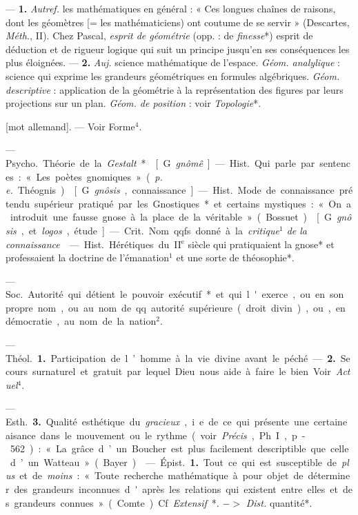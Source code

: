 \begin{itemize}[leftmargin=1cm, label=, itemsep=1pt]
 — {\bf 1.} {\it Autref.} les mathématiques en général : « Ces
longues chaînes de raisons, dont les géomètres [= les mathématiciens) ont
coutume de se servir » (Descartes, {\it Méth.}, II). Chez Pascal,
{\it esprit de géométrie} (opp. : de {\it finesse}*) esprit de déduction et
de rigueur logique qui suit un principe jusqu'en ses conséquences les plus
éloignées. — {\bf 2.} {\it Auj.} science mathématique de l’espace.
{\it Géom. analylique} : science qui exprime les grandeurs géométriques en
formules algébriques. {\it Géom. descriptive} : application de la géométrie à
la représentation des figures par leurs projections sur un plan.
{\it Géom. de position} : voir {\it Topologie}*.

 [mot allemand]. — Voir Forme$^4$.

 — \si{Psycho.} Théorie de la {\it Gestalt}*.

 [G. {\it gnômê}]. — \si{Hist.} Qui parle par sentences : « Les
poètes gnomiques » ({\it p. e.} Théognis).

 [G. {\it gnôsis}, connaissance]. — \si{Hist.} Mode de connaissance
prétendu supérieur pratiqué par les Gnostiques* et certains mystiques : « On
a introduit une fausse gnose à la place de la véritable » (Bossuet).

 [G. {\it gnôsis}, et {\it logos}, étude].
— \si{Crit.} Nom qqfs. donné à la {\it critique$^1$ de la connaissance}.

 — \si{Hist.} Hérétiques du
{\footnotesize II}$^\text{e}$ siècle qui pratiquaient la gnose*
et professaient la doctrine de l’émanation$^1$ et une sorte de théosophie*.

 — \si{Soc.} Autorité qui détient le pouvoir exécutif* et
qui l'exerce, ou en son propre nom, ou au nom de qq. autorité supérieure
(droit divin), ou, en démocratie, au nom de la nation$^2$.

 — \si{Théol.} {\bf 1.} Participation de l’homme à la vie divine
avant le péché. — {\bf 2.} Secours surnaturel et gratuit par lequel Dieu nous
aide à faire le bien. Voir {\it Actuel}$^4$.

— \si{Esth.} {\bf 3.} Qualité esthétique du {\it gracieux}, i. e. de ce qui
présente une certaine aisance dans le mouvement ou le rythme (voir
{\it Précis}, Ph. I, p- 562) : « La grâce d’un Boucher est plus facilement
descriptible que celle d’un Watteau » (Bayer).

 — \si{Épist.} {\bf 1.} Tout ce qui est susceptible de
{\it plus} et de {\it moins} : « Toute recherche mathématique à pour objet de
déterminer des grandeurs inconnues d'après les relations qui existent entre
elles et des grandeurs connues » (Comte). Cf. {\it Extensif}*.
$->$ {\it Dist.} quantité*.


\end{itemize}

